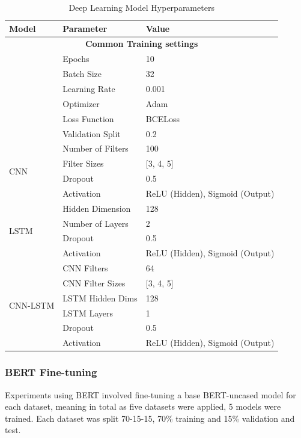 \documentclass[stu,12pt,floatsintext,donotrepeattitle]{apa7}
\begin{document}
\begin{table}[ht]
    \centering
    \caption{Deep Learning Model Hyperparameters}
    \label{tab:dl_model_params}
    \begin{tabular}{l l l}
        \hline
        \textbf{Model} & \textbf{Parameter} & \textbf{Value} \\
        \hline
        \multicolumn{3}{c}{\textbf{Common Training settings}} \\
        & Epochs & 10 \\
        & Batch Size & 32 \\
        & Learning Rate & 0.001 \\
        & Optimizer & Adam \\
        & Loss Function & BCELoss \\
        & Validation Split & 0.2 \\
        \hline
        \multirow{4}{*}{CNN} & Number of Filters & 100 \\
        & Filter Sizes & [3, 4, 5] \\
        & Dropout & 0.5 \\
        & Activation & ReLU (Hidden), Sigmoid (Output) \\
        \hline
        \multirow{4}{*}{LSTM} & Hidden Dimension & 128 \\
        & Number of Layers & 2 \\
        & Dropout & 0.5 \\
        & Activation & ReLU (Hidden), Sigmoid (Output) \\
        \hline
        \multirow{6}{*}{CNN-LSTM} & CNN Filters & 64 \\
        & CNN Filter Sizes & [3, 4, 5] \\
        & LSTM Hidden Dims & 128 \\
        & LSTM Layers & 1 \\
        & Dropout & 0.5 \\
        & Activation & ReLU (Hidden), Sigmoid (Output) \\
        \hline
    \end{tabular}
\end{table}

\subsubsection{BERT Fine-tuning}
Experiments using BERT involved fine-tuning a base BERT-uncased model for each dataset, meaning in total as five datasets were applied, 5 models were trained. Each dataset was split 70-15-15, 70\% training and 15\% validation and test.
\end{document}
